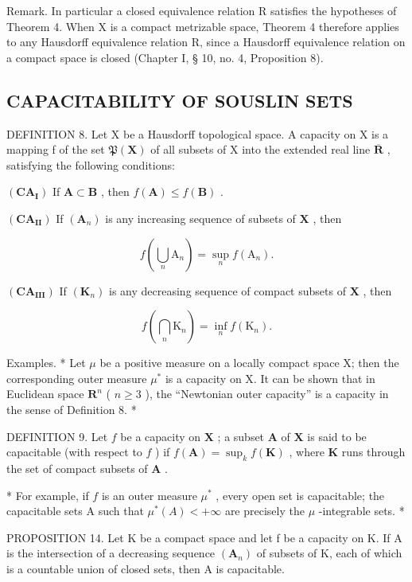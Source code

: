 Remark. In particular a closed equivalence relation R satisfies the hypotheses of Theorem 4. When X is a compact metrizable space, Theorem 4 therefore applies to any Hausdorff equivalence relation R, since a Hausdorff equivalence relation on a compact space is closed (Chapter I, § 10, no. 4, Proposition 8).

\subsection{CAPACITABILITY OF SOUSLIN SETS}

DEFINITION 8. Let X be a Hausdorff topological space. A capacity on X is a mapping f of the set \(\mathfrak{P}(\mathbf{X})\) of all subsets of X into the extended real line \(\overline{\mathbf{R}}\) , satisfying the following conditions:

\((\mathbf{CA}_{\mathbf{I}})\) If \(\mathbf{A} \subset \mathbf{B}\) , then \(f(\mathbf{A}) \leqslant f(\mathbf{B})\) .

\((\mathbf{CA}_{\mathbf{II}})\) If \((\mathbf{A}_n)\) is any increasing sequence of subsets of \(\mathbf{X}\) , then

\[
f \left(\bigcup_ {n} \mathrm{A} _ {n}\right) = \sup _ {n} f (\mathrm{A} _ {n}).
\]

\((\mathbf{CA}_{\mathbf{III}})\) If \((\mathbf{K}_n)\) is any decreasing sequence of compact subsets of \(\mathbf{X}\) , then

\[
f \left(\bigcap_ {n} \mathrm{K} _ {n}\right) = \inf _ {n} f (\mathrm{K} _ {n}).
\]

Examples. * Let \(\mu\) be a positive measure on a locally compact space X; then the corresponding outer measure \(\mu^{*}\) is a capacity on X. It can be shown that in Euclidean space \(\mathbf{R}^{n}\) ( \(n \geqslant 3\) ), the ``Newtonian outer capacity'' is a capacity in the sense of Definition 8. *

DEFINITION 9. Let \(f\) be a capacity on \(\mathbf{X}\) ; a subset \(\mathbf{A}\) of \(\mathbf{X}\) is said to be capacitable (with respect to \(f\) ) if \(f(\mathbf{A}) = \sup_k f(\mathbf{K})\) , where \(\mathbf{K}\) runs through the set of compact subsets of \(\mathbf{A}\) .

* For example, if \(f\) is an outer measure \(\mu^{*}\) , every open set is capacitable; the capacitable sets A such that \(\mu^{*}(A) < +\infty\) are precisely the \(\mu\) -integrable sets. *

PROPOSITION 14. Let K be a compact space and let f be a capacity on K. If A is the intersection of a decreasing sequence \((\mathbf{A}_{n})\) of subsets of K, each of which is a countable union of closed sets, then A is capacitable.

